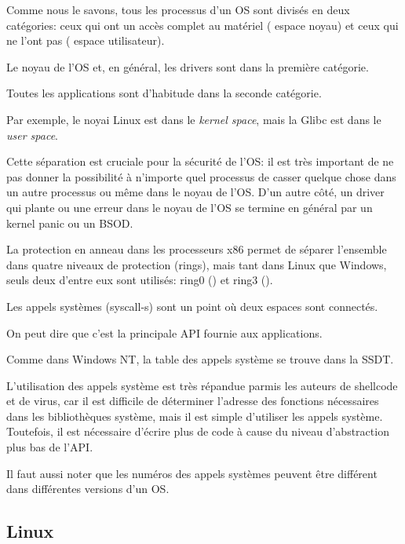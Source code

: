 
\label{syscalls}

Comme nous le savons, tous les processus d'un \ac{OS} sont divisés en deux catégories:
ceux qui ont un accès complet au matériel ( espace noyau)
et ceux qui ne l'ont pas ( espace utilisateur).

Le noyau de l'OS et, en général, les drivers sont dans la première catégorie.

Toutes les applications sont d'habitude dans la seconde catégorie.

Par exemple, le noyai Linux est dans le \emph{kernel space}, mais la Glibc est dans
le \emph{user space}.

Cette séparation est cruciale pour la sécurité de l'\ac{OS}: il est très important
de ne pas donner la possibilité à n'importe quel processus de casser quelque chose
dans un autre processus ou même dans le noyau de l'\ac{OS}.
D'un autre côté, un driver qui plante ou une erreur dans le noyau de l'\ac{OS} se
termine en général par un kernel panic ou un \ac{BSOD}.

La protection en anneau dans les processeurs x86 permet de séparer l'ensemble dans
quatre niveaux de protection (rings), mais tant dans Linux que Windows, seuls deux
d'entre eux sont utilisés: ring0 () et ring3 ().

Les appels systèmes (syscall-s) sont un point où deux espaces sont connectés.

On peut dire que c'est la principale \ac{API} fournie aux applications.

Comme dans \gls{Windows NT}, la table des appels système se trouve dans la \ac{SSDT}.


L'utilisation des appels système est très répandue parmis les auteurs de shellcode
et de virus, car il est difficile de déterminer l'adresse des fonctions nécessaires
dans les bibliothèques système, mais il est simple d'utiliser les appels système.
Toutefois, il est nécessaire d'écrire plus de code à cause du niveau d'abstraction
plus bas de l'\ac{API}.

Il faut aussi noter que les numéros des appels systèmes peuvent être différent dans
différentes versions d'un OS.

\subsection{Linux}
\label{linux_syscall}

